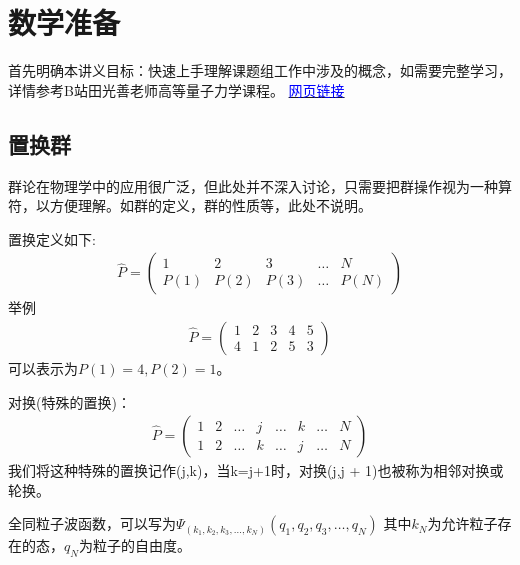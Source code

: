 \documentclass[12pt, a4paper, oneside, UTF8]{ctexbook}
\begin{document}
\section{数学准备}
首先明确本讲义目标：快速上手理解课题组工作中涉及的概念，如需要完整学习，详情参考B站田光善老师高等量子力学课程。
\href{https://www.bilibili.com/video/BV1qk4y1173i?p=1&vd_source=cd4587e54f9d57093a8dbe5712bb9c5e}
{\textcolor{blue}{网页链接}}

\subsection{置换群}
群论在物理学中的应用很广泛，但此处并不深入讨论，只需要把群操作视为一种算符，以方便理解。如群的定义，群的性质等，此处不说明。

置换定义如下:
\begin{align}
    \hat{P}=\left(\begin{matrix}
        1 & 2 & 3 & \dots & N\\
        P(1) & P(2) & P(3)&\dots&P(N)
    \end{matrix}\right)
\end{align}
举例
\begin{align}
    \hat{P}=\left(\begin{matrix}
        1&2&3&4&5\\
        4&1&2&5&3
    \end{matrix}\right)
\end{align}
可以表示为$P(1)=4,P(2)=1$。

对换(特殊的置换)：
\begin{align}
    \hat{P}=\left(\begin{matrix}
        1&2&\dots&j&\dots&k&\dots&N\\
        1&2&\dots&k&\dots&j&\dots&N
    \end{matrix}\right)
\end{align}
我们将这种特殊的置换记作(j,k)，当k=j+1时，对换(j,j + 1)也被称为相邻对换或轮换。

全同粒子波函数，可以写为$\varPsi_{\left(k_1,k_2,k_3,\dots,k_N\right)}(q_1,q_2,q_3,\dots,q_N)$
其中$k_N$为允许粒子存在的态，$q_N$为粒子的自由度。
\end{document}

